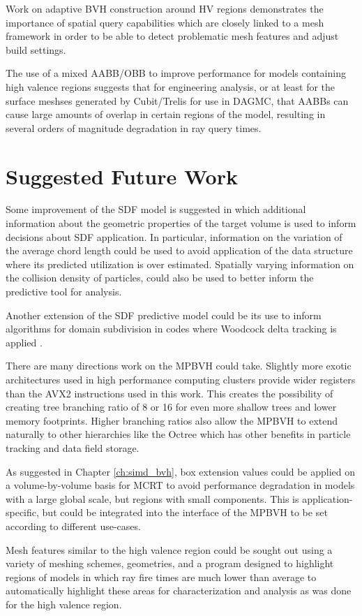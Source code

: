 Work on adaptive BVH construction around HV regions demonstrates the importance
of spatial query capabilities which are closely linked to a mesh framework in
order to be able to detect problematic mesh features and adjust build settings.

The use of a mixed AABB/OBB to improve performance for models containing high
valence regions suggests that for engineering analysis, or at least for the
surface meshses generated by Cubit/Trelis for use in DAGMC, that AABBs can cause
large amounts of overlap in certain regions of the model, resulting in several
orders of magnitude degradation in ray query times.

\section{Suggested Future Work}\label{sec:future_work}

Some improvement of the SDF model is suggested in which additional information
about the geometric properties of the target volume is used to inform decisions
about SDF application. In particular, information on the variation of the
average chord length could be used to avoid application of the data structure
where its predicted utilization is over estimated. Spatially varying information
on the collision density of particles, could also be used to better inform the
predictive tool for analysis.

Another extension of the SDF predictive model could be its use to inform
algorithms for domain subdivision in codes where Woodcock delta tracking is
applied \cite{Leppanen_2010} \cite{Yonghao_2011}. 

There are many directions work on the MPBVH could take. Slightly more exotic
architectures used in high performance computing clusters provide wider
registers than the AVX2 instructions used in this work. This creates the
possibility of creating tree branching ratio of 8 or 16 for even more shallow
trees and lower memory footprints. Higher branching ratios also allow the MPBVH
to extend naturally to other hierarchies like the Octree which has other
benefits in particle tracking and data field storage.

As suggested in Chapter \ref{ch:simd_bvh}, box extension values could be applied
on a volume-by-volume basis for MCRT to avoid performance degradation in models
with a large global scale, but regions with small components. This is
application-specific, but could be integrated into the interface of the MPBVH
to be set according to different use-cases.


Mesh features similar to the high valence region could be sought out using a
variety of meshing schemes, geometries, and a program designed to highlight
regions of models in which ray fire times are much lower than average to
automatically highlight these areas for characterization and analysis as was
done for the high valence region. 


